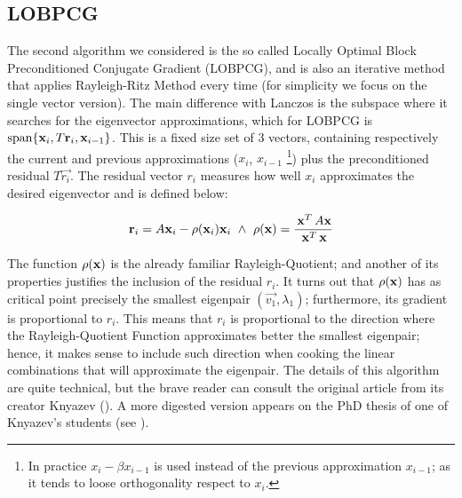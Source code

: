 \subsection{\gls{LOBPCG}}
\label{sub:lobpcg}

The second algorithm we considered is the so called Locally Optimal
Block Preconditioned Conjugate Gradient (\gls{LOBPCG}), and is also an
iterative method that applies Rayleigh-Ritz Method every time (for
simplicity we focus on the single vector version). The main difference
with Lanczos is the subspace where it searches for the eigenvector
approximations, which for \gls{LOBPCG} is $\operatorname{span} \{\mathbf{x}_i,
T\mathbf{r}_i, \mathbf{x}_{i-1}\}$. This is a fixed size set of 3 vectors,
containing respectively the current and previous approximations
($x_i$, $x_{i-1}$ \footnote{In practice $x_{i} - \beta x_{i-1}$ is used
  instead of the previous approximation $x_{i-1}$; as it tends to
  loose orthogonality respect to $x_i$.}) plus the preconditioned
residual $T\vec{r_i}$. The residual vector $r_i$ measures how well
$x_i$ approximates the desired eigenvector and is defined below:

\begin{equation*}
    \joinabove{0}
    \vec{r}_i = A\vec{x}_i - \func{\rho}(\vec{x}_i)\vec{x}_i
    \ds{\land}
    \func{\rho}(\vec{x}) = \dfrac{\trans{\vec{x}}A\vec{x}}{\trans{\vec{x}}\vec{x}}
\end{equation*}
\joinbelow{1cm}

The function $\operatorname{\rho}(\mathbf{x})$ is the already familiar 
Rayleigh-Quotient; and another of its properties justifies the
inclusion of the residual $r_i$. It turns out that
$\operatorname{\rho}(\mathbf{x})$ has as critical point precisely the smallest
eigenpair $(\vec{v_1},\lambda_1)$; furthermore, its gradient is
proportional to $r_i$. This means that $r_i$ is proportional to the
direction where the Rayleigh-Quotient Function approximates better
the smallest eigenpair; hence, it makes sense to include such
direction when cooking the linear combinations that will approximate
the eigenpair. The details of this algorithm are quite
technical, but the brave reader can consult the original article from
its creator Knyazev (\cite{knyazev01}). A more digested version
appears on the PhD thesis of one of Knyazev's students (see
\cite{lashuk07}).  \\ 

